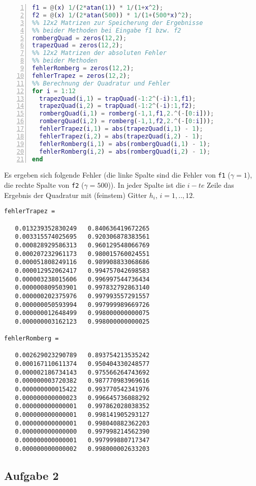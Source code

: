 \documentclass[11pt,a4paper,ngerman]{article}
\begin{document}
\begin{lstlisting}[language=matlab,numbers=left]
%% f1 und f2 sind die beiden zu integrierenden Funktionen
f1 = @(x) 1/(2*atan(1)) * 1/(1+x^2);
f2 = @(x) 1/(2*atan(500)) * 1/(1+(500*x)^2);
%% 12x2 Matrizen zur Speicherung der Ergebnisse
%% beider Methoden bei Eingabe f1 bzw. f2
rombergQuad = zeros(12,2);
trapezQuad = zeros(12,2);
%% 12x2 Matrizen der absoluten Fehler
%% beider Methoden
fehlerRomberg = zeros(12,2);
fehlerTrapez = zeros(12,2);
%% Berechnung der Quadratur und Fehler
for i = 1:12
  trapezQuad(i,1) = trapQuad(-1:2^(-i):1,f1);
  trapezQuad(i,2) = trapQuad(-1:2^(-i):1,f2);
  rombergQuad(i,1) = romberg(-1,1,f1,2.^(-[0:i]));
  rombergQuad(i,2) = romberg(-1,1,f2,2.^(-[0:i]));
  fehlerTrapez(i,1) = abs(trapezQuad(i,1) - 1);
  fehlerTrapez(i,2) = abs(trapezQuad(i,2) - 1);
  fehlerRomberg(i,1) = abs(rombergQuad(i,1) - 1);
  fehlerRomberg(i,2) = abs(rombergQuad(i,2) - 1);
end
\end{lstlisting}

Es ergeben sich folgende Fehler (die linke Spalte sind die Fehler von \texttt{f1} ($\gamma = 1$), die rechte Spalte von \texttt{f2} ($\gamma = 500$)). In jeder Spalte ist die $i-te$ Zeile das Ergebnis der Quadratur mit
(feinstem) Gitter $h_i$, $i = 1,.., 12$.
\begin{lstlisting}
fehlerTrapez =

   0.013239352830249   0.840636419672265
   0.003315574025695   0.920306878383561
   0.000828929586313   0.960129548066769
   0.000207232961173   0.980015760024551
   0.000051808249116   0.989908833068686
   0.000012952062417   0.994757042698583
   0.000003238015606   0.996997544736434
   0.000000809503901   0.997832792863140
   0.000000202375976   0.997993557291557
   0.000000050593994   0.997999989669726
   0.000000012648499   0.998000000000075
   0.000000003162123   0.998000000000025

fehlerRomberg =

   0.002629023290789   0.893754213535242
   0.000167110611374   0.950404330248577
   0.000002186734143   0.975566264743692
   0.000000003720382   0.987770983969616
   0.000000000015422   0.993770542341976
   0.000000000000023   0.996645736088292
   0.000000000000001   0.997862028038352
   0.000000000000001   0.998141905293127
   0.000000000000001   0.998040882362203
   0.000000000000000   0.997998214562390
   0.000000000000001   0.997999880717347
   0.000000000000002   0.998000002633203

\end{lstlisting}

\subsection*{Aufgabe 2}


\label{LastPage}
\end{document}
